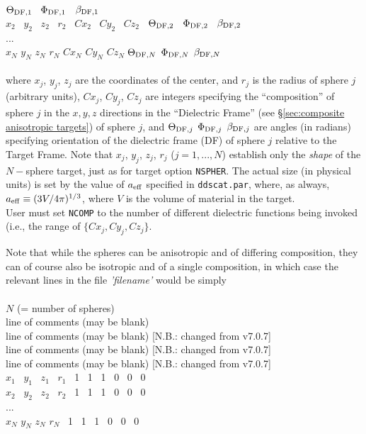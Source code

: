 	$\Theta_{{\rm DF},1}$~ $\Phi_{{\rm DF},1}$~ $\beta_{{\rm DF},1}$\\
	 $x_2$~ $y_2$~ $z_2$~ $r_2$~ $Cx_2$~ $Cy_2$~ $Cz_2$~ 
	$\Theta_{{\rm DF},2}$~ $\Phi_{{\rm DF},2}$~ $\beta_{{\rm DF},2}$\\
	  ... \\
	 $x_N$ $y_N$ $z_N$ $r_N$ $Cx_N$ $Cy_N$ $Cz_N$ 
	$\Theta_{{\rm DF},N}$ $\Phi_{{\rm DF},N}$ $\beta_{{\rm DF},N}$\\ \\
	where $x_j$, $y_j$, $z_j$ are the coordinates of the center,
	and $r_j$ is the radius of sphere $j$ (arbitrary units),
	$Cx_j$, $Cy_j$, $Cz_j$ are integers specifying the ``composition''
	of sphere $j$ in the $x,y,z$ directions in the ``Dielectric Frame''
	(see \S\ref{sec:composite anisotropic targets})
	of sphere $j$, and 
	\index{$\Theta_\DF$}
	$\Theta_{{\rm DF},j}$ 
	\index{$\Phi_\DF$}
	$\Phi_{{\rm DF},j}$ 
	\index{$\beta_\DF$}
	$\beta_{{\rm DF},j}$
	are angles (in radians) specifying orientation of the 
	dielectric frame (DF) of
	sphere $j$ relative to the Target Frame.
	Note that $x_j$, $y_j$, $z_j$, $r_j$ ($j=1,...,N$) establish only
	the {\it shape} of the $N-$sphere target, just as for
	target option {\tt NSPHER}.
	The actual size (in physical units) is set by the value
	of $a_{\rm eff}$ specified in {\tt ddscat.par}, where, as
	always, $a_{\rm eff}\equiv (3 V/4\pi)^{1/3}$, where $V$ is the
	volume of material in the target.\\
	User must set {\tt NCOMP} to the number of different dielectric 
	functions being invoked (i.e., the range of $\{Cx_j,Cy_j,Cz_j\}$.

	Note that while the spheres can be anisotropic and of differing
	composition, they can of course also be isotropic and of a single
	composition, in which case the relevant lines in the file
	{\it 'filename'} would be simply\\ \\
	 $N$ (= number of spheres)\\
	 line of comments (may be blank)\\
	 line of comments (may be blank) [N.B.: changed from v7.0.7]\\
	 line of comments (may be blank) [N.B.: changed from v7.0.7]\\
	 line of comments (may be blank) [N.B.: changed from v7.0.7]\\
	 $x_1$~ $y_1$~ $z_1$~ $r_1$~ 1 ~1 ~1 ~0 ~0 ~0\\
	 $x_2$~ $y_2$~ $z_2$~ $r_2$~ 1 ~1 ~1 ~0 ~0 ~0\\
	  ... \\
	 $x_N$ $y_N$ $z_N$ $r_N$ ~1 ~1 ~1 ~0 ~0 ~0\\

